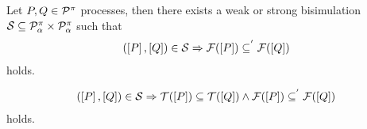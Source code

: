 \begin{cor}
\label{cor_sim_simp_failure_inclution}
Let $P,Q\in\mathcal P^{\pi}$ processes, then there exists a weak or strong bisimulation $\mathcal{S}\subseteq\mathcal P^{\pi}_\alpha\times\mathcal P^{\pi}_\alpha$ such that
\begin{align}
(\ec{P},\ec{Q})\in{}\simu  \Rightarrow \failures[P]\subseteq^{'}\failures[Q]
   \label{sim_simp_failure_inc}
\end{align}
holds.
\end{cor}%



\begin{cor}[MM]
\label{cor_sim_simp_failure_refinement}

\begin{align}
   (\ec{P},\ec{Q})\in{}\simu  \Rightarrow  \traces[P]\subseteq\traces[Q] \wedge \failures[P]\subseteq^{'}\failures[Q]
\end{align}
holds.
\end{cor}%
